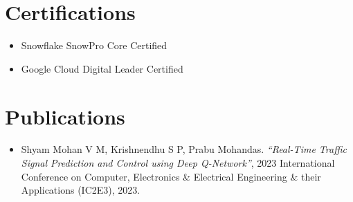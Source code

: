 \documentclass[11pt,a4paper]{article}
\begin{document}
\section*{Certifications}
\begin{itemize}[leftmargin=0.5cm]
    \item Snowflake SnowPro Core Certified
    \item Google Cloud Digital Leader Certified
\end{itemize}



\section*{Publications}
\begin{itemize}[leftmargin=0.5cm]
    \item Shyam Mohan V M, Krishnendhu S P, Prabu Mohandas. \textit{“Real-Time Traffic Signal Prediction and Control using Deep Q-Network”}, 2023 International Conference on Computer, Electronics \& Electrical Engineering \& their Applications (IC2E3), 2023.
\end{itemize}
\end{document}
